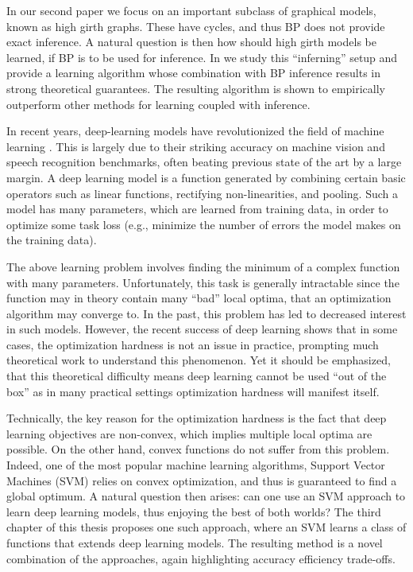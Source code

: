 In our second paper  \cite{heinemann2014inferning} we focus on an important subclass of graphical models, known as high girth graphs. These have cycles, and thus BP does not provide exact inference. A natural question is then how should high girth models be learned, if BP is to be used for inference. In   \cite{heinemann2014inferning} we study this ``inferning'' setup and provide a learning algorithm whose combination with BP inference results in strong theoretical guarantees. The resulting algorithm is shown to empirically outperform other methods for learning coupled with inference.

In recent years, deep-learning models have revolutionized the field of machine learning  \cite{lecun2015deep}.
This is largely due to their striking accuracy on machine vision  \cite{krizhevsky2012imagenet} and speech recognition  \cite{mohamed2009deep, hinton2012deep} benchmarks, often beating previous state of the art by a large margin. A deep learning model is a function generated by combining certain basic operators such as linear functions, rectifying non-linearities, and pooling.
 Such a model has many parameters, which are learned from training data, in order to optimize some task loss (e.g., minimize the number of errors the model makes on the training data). 

The above learning problem involves finding the minimum of a complex function with many parameters.
Unfortunately, this task is generally intractable  \cite{livni2014computational} since the function may in theory contain many ``bad'' local optima, that an optimization algorithm may converge to.
In the past, this problem has led to decreased interest in such models.
However, the recent success of deep learning shows that in some cases, the optimization hardness is not an issue in practice, prompting much theoretical work to understand this phenomenon.
Yet it should be emphasized, that this theoretical difficulty means deep learning cannot be used ``out of the box'' as in many practical settings optimization hardness will manifest itself.

Technically, the key reason for the optimization hardness is the fact that  deep learning objectives are non-convex, which implies multiple local optima are possible.
On the other hand, convex functions do not suffer from this problem.
Indeed, one of the most popular machine learning algorithms, Support Vector Machines (SVM) relies on convex optimization, and thus is guaranteed to find a global optimum.
A natural question then arises: can one use an SVM approach to learn deep learning models, thus enjoying the best of both worlds? The third chapter of this thesis proposes one such approach, where an SVM learns a class of functions that extends deep learning models.
The resulting method is a novel combination of the approaches, again highlighting accuracy efficiency trade-offs. 

